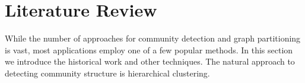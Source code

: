 \chapter{Literature Review}

While the number of approaches for community detection and graph partitioning is vast, most applications employ one of a few popular methods. In this section we introduce the historical work and other techniques. The natural approach to detecting community structure is hierarchical clustering.

\cite{Kernighan1970, Simon1989}





\cite{Brandes}
\cite{Girvan2002}




